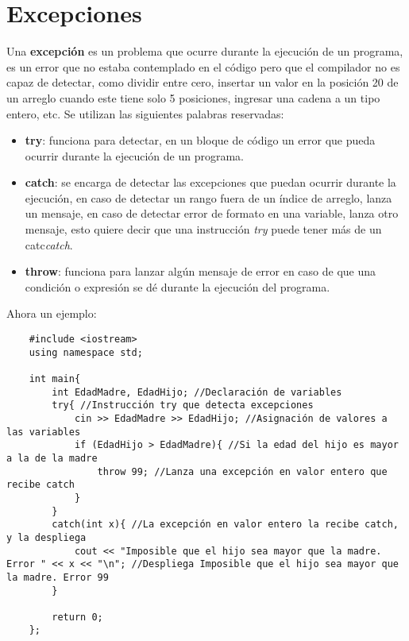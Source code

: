 \section{Excepciones}
Una \textbf{excepción} es un problema que ocurre durante la ejecución de un programa, es un error que no estaba contemplado en el código pero que el compilador no es capaz de detectar, como dividir entre cero, insertar un valor en la posición 20 de un arreglo cuando este tiene solo 5 posiciones, ingresar una cadena a un tipo entero, etc. Se utilizan las siguientes palabras reservadas:
\begin{itemize}
    \item \textbf{try}: funciona para detectar, en un bloque de código un error que pueda ocurrir durante la ejecución de un programa.
    \item \textbf{catch}: se encarga de detectar las excepciones que puedan ocurrir durante la ejecución, en caso de detectar un rango fuera de un índice de arreglo, lanza un mensaje, en caso de detectar error de formato en una variable, lanza otro mensaje, esto quiere decir que una instrucción \textit{try} puede tener más de un catc\textit{catch}.
    \item \textbf{throw}: funciona para lanzar algún mensaje de error en caso de que una condición o expresión se dé durante la ejecución del programa.
\end{itemize}
Ahora un ejemplo:
\begin{lstlisting}
    #include <iostream>
    using namespace std;
    
    int main{
        int EdadMadre, EdadHijo; //Declaración de variables
        try{ //Instrucción try que detecta excepciones
            cin >> EdadMadre >> EdadHijo; //Asignación de valores a las variables
            if (EdadHijo > EdadMadre){ //Si la edad del hijo es mayor a la de la madre
                throw 99; //Lanza una excepción en valor entero que recibe catch
            }
        }
        catch(int x){ //La excepción en valor entero la recibe catch, y la despliega
            cout << "Imposible que el hijo sea mayor que la madre. Error " << x << "\n"; //Despliega Imposible que el hijo sea mayor que la madre. Error 99
        }
        
        return 0;
    };
\end{lstlisting}



